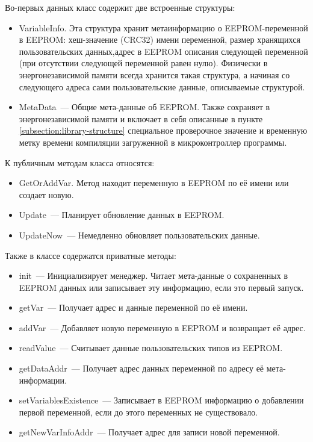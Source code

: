Во-первых данных класс содержит две встроенные структуры:

\begin{itemize}
	\item VariableInfo. Эта структура хранит метаинформацию о EEPROM-переменной в EEPROM: хеш-значение (CRC32) имени переменной, размер хранящихся пользовательских данных,адрес в EEPROM описания следующей переменной (при отсутствии следующей переменной равен нулю).
	Физически в энергонезависимой памяти всегда хранится такая структура, а начиная со следующего адреса сами пользовательские данные, описываемые структурой. 
	
	\item MetaData~--- Общие мета-данные об EEPROM. 
	Также сохраняет в энергонезависимой памяти и включает в себя описанные в пункте \ref{subsection:library-structure} специальное проверочное значение и временную метку времени компиляции загруженной в микроконтроллер программы.
\end{itemize}

К публичным методам класса относятся:
\begin{itemize}
	\item GetOrAddVar. Метод находит переменную в EEPROM по её имени или создает новую.
	\item Update~--- Планирует обновление данных в EEPROM.
	\item UpdateNow~--- Немедленно обновляет пользовательских данные.
\end{itemize}

Также в классе содержатся приватные методы:

\begin{itemize}
	\item init~--- Инициализирует менеджер. Читает мета-данные о сохраненных в EEPROM данных или записывает эту информацию, если это первый запуск.
	\item getVar~--- Получает адрес и данные переменной по её имени.
	\item addVar~--- Добавляет новую переменную в EEPROM и возвращает её адрес.
	\item readValue~--- Считывает данные пользовательских типов из EEPROM.
	\item getDataAddr~--- Получает адрес данных переменной по адресу её мета-информации.
	\item setVariablesExistence~--- Записывает в EEPROM информацию о добавлении первой переменной, если до этого переменных не существовало.
	\item getNewVarInfoAddr~--- Получает адрес для записи новой переменной.
\end{itemize}

